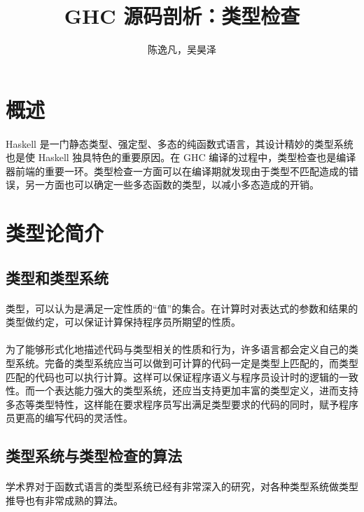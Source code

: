 \documentclass{article}
\author{陈逸凡，吴昊泽}
\title{GHC 源码剖析：类型检查}
\begin{document}
	\maketitle
	\section{概述}
	\paragraph{}
	Haskell 是一门静态类型、强定型、多态的纯函数式语言，其设计精妙的类型系统也是使 Haskell 独具特色的重要原因。在 GHC 编译的过程中，类型检查也是编译器前端的重要一环。类型检查一方面可以在编译期就发现由于类型不匹配造成的错误，另一方面也可以确定一些多态函数的类型，以减小多态造成的开销。
	\section{类型论简介}
	\subsection{类型和类型系统}
	\paragraph{}
	类型，可以认为是满足一定性质的“值”的集合。在计算时对表达式的参数和结果的类型做约定，可以保证计算保持程序员所期望的性质。
	\paragraph{}
	为了能够形式化地描述代码与类型相关的性质和行为，许多语言都会定义自己的类型系统。完备的类型系统应当可以做到可计算的代码一定是类型上匹配的，而类型匹配的代码也可以执行计算。这样可以保证程序语义与程序员设计时的逻辑的一致性。而一个表达能力强大的类型系统，还应当支持更加丰富的类型定义，进而支持多态等类型特性，这样能在要求程序员写出满足类型要求的代码的同时，赋予程序员更高的编写代码的灵活性。
	\subsection{类型系统与类型检查的算法}
	\paragraph{}
	学术界对于函数式语言的类型系统已经有非常深入的研究，对各种类型系统做类型推导也有非常成熟的算法。
\end{document}
